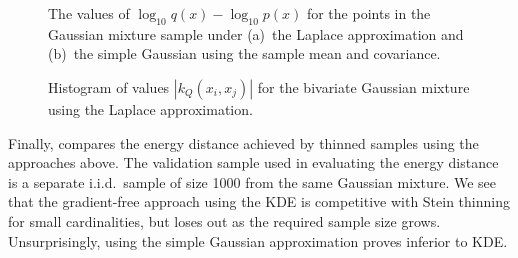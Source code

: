 \documentclass[11pt,a4paper]{report}
\begin{document}
\begin{figure}[h]
\centering
{}
\caption{The values of $\log_{10} q(x) - \log_{10} p(x)$ for the points in the Gaussian mixture sample under (a)~the Laplace approximation and (b)~the simple Gaussian using the sample mean and covariance.
\label{fig:gmm:laplace-failure}}
\end{figure}

\begin{figure}[h]
\centering
{}
\caption{Histogram of values $|k_Q(x_i, x_j)|$ for the bivariate Gaussian mixture using the Laplace approximation.
\label{fig:gmm:kQ:hist}}
\end{figure}

Finally,  compares the energy distance achieved by thinned samples using the approaches above. The validation sample used in evaluating the energy distance is a separate i.i.d.\ sample of size 1000 from the same Gaussian mixture. We see that the gradient-free approach using the KDE is competitive with Stein thinning for small cardinalities, but loses out as the required sample size grows. Unsurprisingly, using the simple Gaussian approximation proves inferior to KDE.
\end{document}
